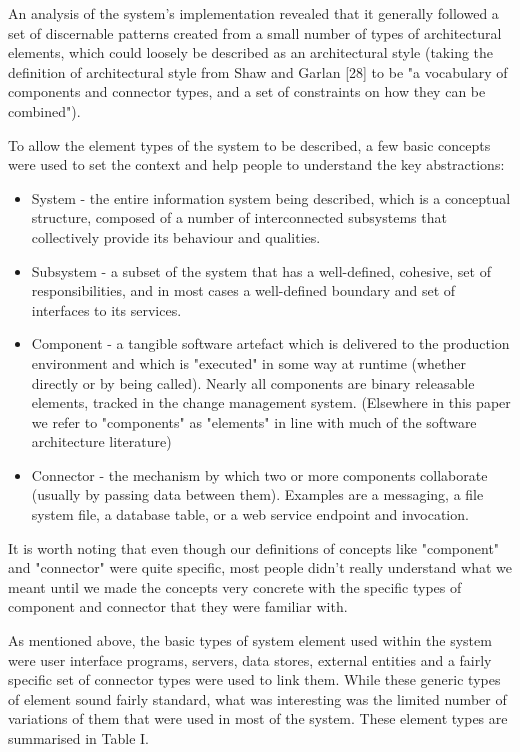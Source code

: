 \begin{itemise}
  An analysis of the system's implementation revealed that it generally followed a set of discernable patterns created from a small number of types of architectural elements, which could loosely be described as an architectural style (taking the definition of architectural style from Shaw and Garlan [28] to be "a vocabulary of components and connector types, and a set of constraints on how they can be combined").  

  To allow the element types of the system to be described, a few basic concepts were used to set the context and help people to understand the key abstractions:

\begin{itemize}
\item System - the entire information system being described, which is a conceptual structure, composed of a number of interconnected subsystems that collectively provide its behaviour and qualities.

\item Subsystem - a subset of the system that has a well-defined, cohesive, set of responsibilities, and in most cases a well-defined boundary and set of interfaces to its services.

\item Component - a tangible software artefact which is delivered to the production environment and which is "executed" in some way at runtime (whether directly or by being called). Nearly all components are binary releasable elements, tracked in the change management system. (Elsewhere in this paper we refer to "components" as "elements" in line with much of the software architecture literature)

\item Connector - the mechanism by which two or more components collaborate (usually by passing data between them).  Examples are a messaging, a file system file, a database table, or a web service endpoint and invocation.

\end{itemize}

  It is worth noting that even though our definitions of concepts like "component" and "connector" were quite specific, most people didn't really understand what we meant until we made the concepts very concrete with the specific types of component and connector that they were familiar with.

  As mentioned above, the basic types of system element used within the system were user interface programs, servers, data stores, external entities and a fairly specific set of connector types were used to link them.  While these generic types of element sound fairly standard, what was interesting was the limited number of variations of them that were used in most of the system.  These element types are summarised in Table I.


\end{itemise}
